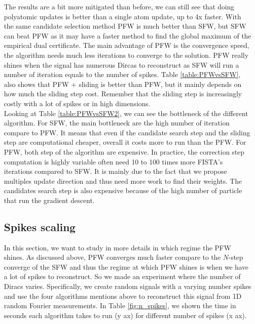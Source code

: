 \documentclass[a4paper,12pt,oneside]{report}
\theoremstyle{named}
\begin{document}
The results are a bit more mitigated than before, we can still see that doing polyatomic updates is better than a single atom update, up to 4x faster. With the same candidate selection method PFW is much better than SFW, but SFW can beat PFW as it may have a faster method to find the global maximum of the empirical dual certificate. The main advantage of PFW is the convergence speed, the algorithm needs much less iterations to converge to the solution. PFW really shines when the signal has numerous Dircas to reconstruct as SFW will run a number of iteration equals to the number of spikes. Table \ref{table:PFWvsSFW}, also shows that PFW + sliding is better than PFW, but it mainly depends on how much the sliding step cost. Remember that the sliding step is increasingly costly with a lot of spikes or in high dimensions.\\

Looking at Table \ref{table:PFWvsSFW2}, we can see the bottleneck of the different algorithm. For SFW, the main bottleneck are the high number of iteration compare to PFW. It means that even if the candidate search step and the sliding step are computational cheaper, overall it costs more to run than the PFW. For PFW, both step of the algorithm are expensive. In practice, the correction step computation is highly variable often need 10 to 100 times more FISTA's iterations compared to SFW. It is mainly due to the fact that we propose multiples update direction and thus need more work to find their weights. The candidates search step is also expensive because of the high number of particle that run the gradient descent.

\subsection{Spikes scaling} \label{spikes_scaling}
In this section, we want to study in more details in which regime the PFW shines. As discussed above, PFW converges much faster compare to the $N$-step converge of the SFW and thus the regime at which PFW shines is when we have a lot of spikes to reconstruct. So we made an experiment where the number of Diracs varies. Specifically, we create random signals with a varying number spikes and use the four algorithms mentions above to reconstruct this signal from 1D random Fourier measurements. In Table \ref{fig:n_spikes}, we shown the time in seconds each algorithm takes to run (y ax) for different number of spikes (x ax). \\
\end{document}
